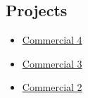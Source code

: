 \subsection{Projects}

\begin{itemize}
    \item \hyperlink{proj_com4}{Commercial 4}
    \item \hyperlink{proj_com3}{Commercial 3}
    \item \hyperlink{proj_com2}{Commercial 2}
\end{itemize}

\newpage
